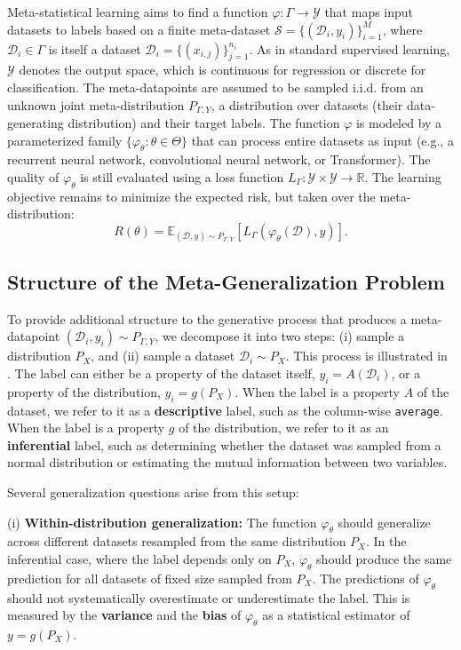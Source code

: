 Meta-statistical learning aims to find a function $\varphi: \Gamma \to \mathcal{Y}$ that maps input datasets to labels based on a finite meta-dataset $\mathcal{S} = \{(\mathcal{D}_i, y_i)\}_{i=1}^{M}$, where $\mathcal{D}_i \in \Gamma$ is itself a dataset $\mathcal{D}_i = \{(x_{i,j})\}_{j=1}^{n_i}$. As in standard supervised learning, $\mathcal{Y}$ denotes the output space, which is continuous for regression or discrete for classification. The meta-datapoints are assumed to be sampled i.i.d. from an unknown joint meta-distribution $P_{\Gamma,Y}$, a distribution over datasets (their data-generating distribution) and their target labels.
% 
The function $\varphi$ is modeled by a parameterized family $\{\varphi_{\theta} : \theta \in \Theta\}$ that can process entire datasets as input (e.g., a recurrent neural network, convolutional neural network, or Transformer). The quality of $\varphi_{\theta}$ is still evaluated using a loss function $L_{\Gamma}: \mathcal{Y} \times \mathcal{Y} \to \mathbb{R}$. The learning objective remains to minimize the expected risk, but taken over the meta-distribution:
\[
R(\theta) = \mathbb{E}_{(\mathcal{D}, y) \sim P_{\Gamma, Y}} \left[L_{\Gamma}\left(\varphi_{\theta}(\mathcal{D}), y\right)\right].
\]

\subsection{Structure of the Meta-Generalization Problem}

To provide additional structure to the generative process that produces a meta-datapoint \( (\mathcal{D}_i, y_i) \sim P_{\Gamma, Y} \), we decompose it into two steps: (i) sample a distribution \( P_X \), and (ii) sample a dataset \( \mathcal{D}_i \sim P_X \). This process is illustrated in . The label can either be a property of the dataset itself, \( y_i = A(\mathcal{D}_i) \), or a property of the distribution, \( y_i = g(P_X) \).  When the label is a property \( A \) of the dataset, we refer to it as a \textbf{descriptive} label, such as the column-wise \texttt{average}. When the label is a property \( g \) of the distribution, we refer to it as an \textbf{inferential} label, such as determining whether the dataset was sampled from a normal distribution or estimating the mutual information between two variables.

Several generalization questions arise from this setup:

(i) \textbf{Within-distribution generalization:} The function \( \varphi_{\theta} \) should generalize across different datasets resampled from the same distribution \( P_X \). In the inferential case, where the label depends only on \( P_X \), \( \varphi_{\theta} \) should produce the same prediction for all datasets of fixed size sampled from \( P_X \). The predictions of \( \varphi_{\theta} \) should not systematically overestimate or underestimate the label. This is measured by the \textbf{variance} and the \textbf{bias} of \( \varphi_{\theta} \) as a statistical estimator of \( y = g(P_X) \).

